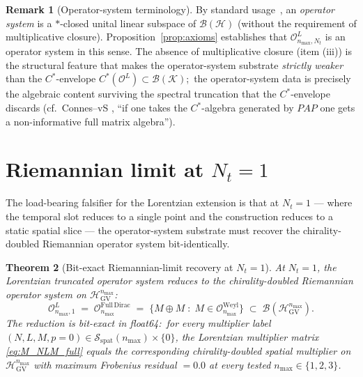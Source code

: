 \documentclass[11pt,a4paper]{article}
\theoremstyle{plain}
\newtheorem{theorem}{Theorem}[section]
\theoremstyle{definition}
\newtheorem{remark}[theorem]{Remark}
\newcommand{\nmax}{n_{\max}}
\newcommand{\Nt}{N_t}
\newcommand{\Hilb}{\mathcal{H}}
\newcommand{\Krein}{\mathcal{K}}
\newcommand{\Op}{\mathcal{O}}
\newcommand{\Bcal}{\mathcal{B}}
\newcommand{\HGV}{\mathcal{H}_{\mathrm{GV}}}
\newcommand{\spat}{\mathrm{spat}}
\newcommand{\Weyl}{\mathrm{Weyl}}
\begin{document}
\begin{remark}[Operator-system terminology]\label{rem:op_system}
By standard usage~\cite{paulsen2002,connes_vs2021}, an
\emph{operator system} is a $*$-closed unital linear subspace of
$\Bcal(\Hilb)$ (without the requirement of multiplicative closure).
Proposition~\ref{prop:axioms} establishes that
$\Op_{\nmax, \Nt}^L$ is an operator system in this sense. The
absence of multiplicative closure (item (iii)) is the structural
feature that makes the operator-system substrate \emph{strictly
weaker} than the $C^*$-envelope $C^*(\Op^L) \subset \Bcal(\Krein)$;\
the operator-system data is precisely the algebraic content surviving
the spectral truncation that the $C^*$-envelope discards (cf.\
Connes--vS \cite{connes_vs2021}, ``if one takes the $C^*$-algebra
generated by $PAP$ one gets a non-informative full matrix algebra'').
\end{remark}

\section{Riemannian limit at $\Nt = 1$}\label{sec:riem_limit}

The load-bearing falsifier for the Lorentzian extension is that at
$\Nt = 1$ — where the temporal slot reduces to a single point and the
construction reduces to a static spatial slice — the operator-system
substrate must recover the chirality-doubled Riemannian operator
system bit-identically.

\begin{theorem}[Bit-exact Riemannian-limit recovery at $\Nt = 1$]
\label{thm:riemannian_limit}
At $\Nt = 1$, the Lorentzian truncated operator system reduces to the
chirality-doubled Riemannian operator system on $\HGV^{\nmax}$:
\begin{equation}\label{eq:riem_limit}
   \Op_{\nmax, 1}^L
   \;=\; \Op_{\nmax}^{\mathrm{Full\,Dirac}}
   \;=\; \bigl\{
           M \oplus M \;:\; M \in \Op_{\nmax}^{\Weyl}
         \bigr\}
   \;\subset\; \Bcal(\HGV^{\nmax}).
\end{equation}
The reduction is bit-exact in float64:\ for every multiplier label
$(N, L, M, p = 0) \in \mathcal{S}_{\spat}(\nmax) \times \{0\}$, the
Lorentzian multiplier matrix \eqref{eq:M_NLM_full} equals the
corresponding chirality-doubled spatial multiplier on $\HGV^{\nmax}$
with maximum Frobenius residual $= 0.0$ at every tested
$\nmax \in \{1, 2, 3\}$.
\end{theorem}
\end{document}
